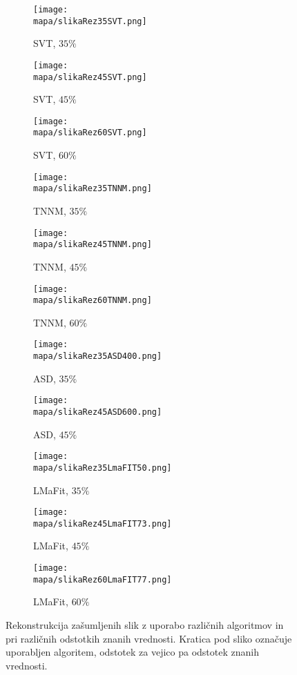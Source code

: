 \begin{figure}[!ht]
    \centering
    \begin{subfigure}{0.325\linewidth}
        \texttt{[image: \\mapa/slikaRez35SVT.png]}
        \caption{SVT, $35\%$}
    \end{subfigure}
    \hfill
    \begin{subfigure}{0.325\linewidth}
        \texttt{[image: \\mapa/slikaRez45SVT.png]}
        \caption{SVT, $45\%$}
    \end{subfigure}
    \hfill
    \begin{subfigure}{0.325\linewidth}
        \texttt{[image: \\mapa/slikaRez60SVT.png]}
        \caption{SVT, $60\%$}
    \end{subfigure}
    \begin{subfigure}{0.325\linewidth}
        \texttt{[image: \\mapa/slikaRez35TNNM.png]}
        \caption{TNNM, $35\%$}
    \end{subfigure}
    \hfill
    \begin{subfigure}{0.325\linewidth}
        \texttt{[image: \\mapa/slikaRez45TNNM.png]}
        \caption{TNNM, $45\%$}
    \end{subfigure}
    \hfill
    \begin{subfigure}{0.325\linewidth}
        \texttt{[image: \\mapa/slikaRez60TNNM.png]}
        \caption{TNNM, $60\%$}
    \end{subfigure}
    \begin{subfigure}{0.325\linewidth}
        \texttt{[image: \\mapa/slikaRez35ASD400.png]}
        \caption{ASD, $35\%$}
    \end{subfigure}
    \hfill
    \begin{subfigure}{0.325\linewidth}
        \texttt{[image: \\mapa/slikaRez45ASD600.png]}
        \caption{ASD, $45\%$}
    \end{subfigure}
    \begin{subfigure}{0.325\linewidth}
        \hfill
    \end{subfigure}
    \begin{subfigure}{0.325\linewidth}
        \texttt{[image: \\mapa/slikaRez35LmaFIT50.png]}
        \caption{LMaFit, $35\%$}
    \end{subfigure}
    \hfill
    \begin{subfigure}{0.325\linewidth}
        \texttt{[image: \\mapa/slikaRez45LmaFIT73.png]}
        \caption{LMaFit, $45\%$}
    \end{subfigure}
    \begin{subfigure}{0.325\linewidth}
        \texttt{[image: \\mapa/slikaRez60LmaFIT77.png]}
        \caption{LMaFit, $60\%$}
    \end{subfigure}
    \caption{Rekonstrukcija zašumljenih slik z uporabo različnih algoritmov in pri različnih odstotkih znanih vrednosti. Kratica pod sliko označuje uporabljen algoritem, odstotek za vejico pa odstotek znanih vrednosti.}
\end{figure}